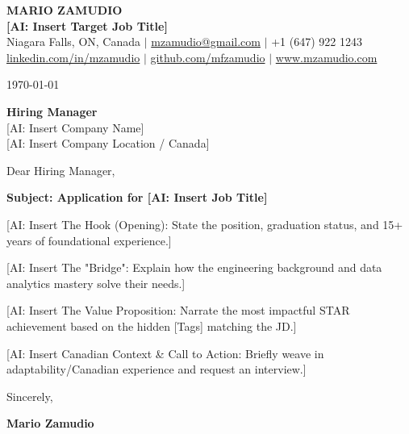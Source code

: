 \documentclass[letterpaper,10pt]{article}
\begin{document}
\begin{center}
{\Huge \textbf{MARIO ZAMUDIO}} \\ \vspace{0.3em}
{\large \textbf{[AI: Insert Target Job Title]}} \\ \vspace{0.3em}
Niagara Falls, ON, Canada $|$ \href{mailto:mzamudio@gmail.com}{mzamudio@gmail.com} $|$ +1 (647) 922 1243 \\
\href{https://linkedin.com/in/mzamudio}{linkedin.com/in/mzamudio} $|$ \href{https://github.com/mfzamudio}{github.com/mfzamudio} $|$ \href{https://www.mzamudio.com}{www.mzamudio.com}
\end{center}

\vspace{2em} %

\today %

\vspace{1em}

\textbf{Hiring Manager} \\
{[AI: Insert Company Name]} \\
{[AI: Insert Company Location / Canada]}

\vspace{1.5em}

Dear Hiring Manager,

\vspace{1em}

\textbf{Subject: Application for [AI: Insert Job Title]}

\vspace{1em}


[AI: Insert The Hook (Opening): State the position, graduation status, and 15+ years of foundational experience.]

[AI: Insert The "Bridge": Explain how the engineering background and data analytics mastery solve their needs.]

[AI: Insert The Value Proposition: Narrate the most impactful STAR achievement based on the hidden [Tags] matching the JD.]

[AI: Insert Canadian Context & Call to Action: Briefly weave in adaptability/Canadian experience and request an interview.]

\vspace{2em}

Sincerely,

\vspace{2em} %

\textbf{Mario Zamudio}
\end{document}
